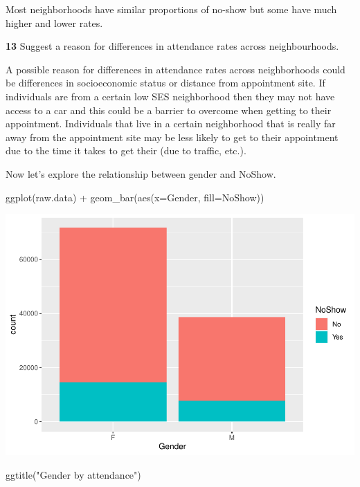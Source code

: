 \documentclass[
]{article}
\newenvironment{Shaded}{\begin{snugshade}}{\end{snugshade}}
\newcommand{\AttributeTok}[1]{\textcolor[rgb]{0.77,0.63,0.00}{#1}}
\newcommand{\FunctionTok}[1]{\textcolor[rgb]{0.00,0.00,0.00}{#1}}
\newcommand{\NormalTok}[1]{#1}
\newcommand{\SpecialCharTok}[1]{\textcolor[rgb]{0.00,0.00,0.00}{#1}}
\newcommand{\StringTok}[1]{\textcolor[rgb]{0.31,0.60,0.02}{#1}}
\begin{document}
Most neighborhoods have similar proportions of no-show but some have
much higher and lower rates.

\textbf{13} Suggest a reason for differences in attendance rates across
neighbourhoods.

A possible reason for differences in attendance rates across
neighborhoods could be differences in socioeconomic status or distance
from appointment site. If individuals are from a certain low SES
neighborhood then they may not have access to a car and this could be a
barrier to overcome when getting to their appointment. Individuals that
live in a certain neighborhood that is really far away from the
appointment site may be less likely to get to their appointment due to
the time it takes to get their (due to traffic, etc.).

Now let's explore the relationship between gender and NoShow.

\begin{Shaded}
\begin{Highlighting}[]
\FunctionTok{ggplot}\NormalTok{(raw.data) }\SpecialCharTok{+} 
  \FunctionTok{geom\_bar}\NormalTok{(}\FunctionTok{aes}\NormalTok{(}\AttributeTok{x=}\NormalTok{Gender, }\AttributeTok{fill=}\NormalTok{NoShow))}
\end{Highlighting}
\end{Shaded}

\begin{center}\includegraphics{lab1_medical_databases_files/figure-latex/unnamed-chunk-12-1} \end{center}

\begin{Shaded}
\begin{Highlighting}[]
  \FunctionTok{ggtitle}\NormalTok{(}\StringTok{"Gender by attendance"}\NormalTok{)}
\end{Highlighting}
\end{Shaded}
\end{document}
